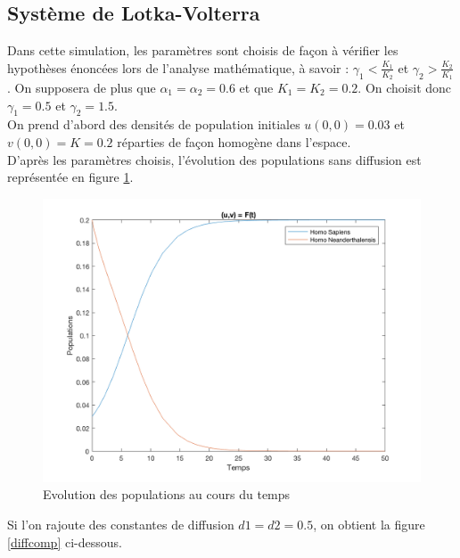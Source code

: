 \documentclass[a4paper,11pt]{article}
\begin{document}
\subsection{Système de Lotka-Volterra}

Dans cette simulation, les paramètres sont choisis de façon à vérifier les hypothèses énoncées lors de l'analyse mathématique, à savoir : $\gamma_1 < \frac{K_1}{K_2}$ et $\gamma_2 > \frac{K_2}{K_1}$. On supposera de plus que $\alpha_1 = \alpha_2 = 0.6$ et que $K_1 = K_2 = 0.2$. On choisit donc $\gamma_1 = 0.5$ et $\gamma_2 = 1.5$.\\

On prend d'abord des densités de population initiales $u(0,0) = 0.03$ et $v(0,0) = K = 0.2$ réparties de façon homogène dans l'espace.\\
D'après les paramètres choisis, l'évolution des populations sans diffusion est représentée en figure
\ref{pop}.\\

\begin{figure}[H]
\centering
\includegraphics[scale=0.3]{Comp/pop.png}
\caption{Evolution des populations au cours du temps}
\label{pop}
\end{figure}

Si l'on rajoute des constantes de diffusion $d1 = d2 = 0.5$, on obtient la figure \ref{diffcomp} ci-dessous.\\
\end{document}
